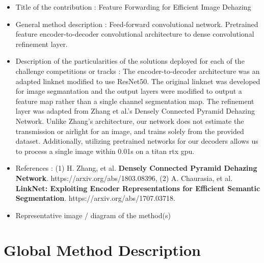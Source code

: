 \documentclass{article}
\begin{document}
\begin{itemize}
\item Title of the contribution : Feature Forwarding for Efficient Image Dehazing                                
\item General method description : Feed-forward convolutional network. Pretrained feature encoder-to-decoder convolutional architecture to dense convolutional refinement layer.                                    
\item Description of the particularities of the solutions deployed for each of the challenge competitions or tracks : The encoder-to-decoder architecture was an adapted linknet modified to use ResNet50. The original linknet was developed for image segmantation and the output layers were modified to output a feature map rather than a single channel segmentation map. The refinement layer was adapted from Zhang et al.'s Densely Connected Pyramid Dehazing Network. Unlike Zhang's architecture, our network does not estimate the transmission or airlight for an image, and trains solely from the provided  dataset. Additionally, utilizing pretrained networks for our decoders allows us to process a single image within 0.01s on a titan rtx gpu.   
\item References : (1) H. Zhang, et al. \textbf{Densely Connected Pyramid Dehazing Network}. https://arxiv.org/abs/1803.08396, (2) A. Chaurasia, et al.                                    
\textbf{LinkNet: Exploiting Encoder Representations for Efficient Semantic Segmentation}. https://arxiv.org/abs/1707.03718.          
\item Representative image / diagram of the method(s)             
\end{itemize}

\section{Global Method Description}
\end{document}
